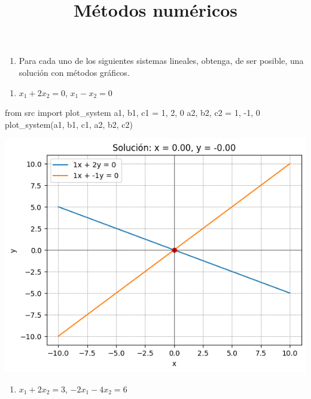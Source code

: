 \documentclass[
  letterpaper,
  DIV=11,
  numbers=noendperiod]{scrartcl}
\title{Métodos numéricos}
\author{}
\date{}
\newenvironment{Shaded}{\begin{snugshade}}{\end{snugshade}}
\newcommand{\DecValTok}[1]{\textcolor[rgb]{0.68,0.00,0.00}{#1}}
\newcommand{\ImportTok}[1]{\textcolor[rgb]{0.00,0.46,0.62}{#1}}
\newcommand{\NormalTok}[1]{\textcolor[rgb]{0.00,0.23,0.31}{#1}}
\newcommand{\OperatorTok}[1]{\textcolor[rgb]{0.37,0.37,0.37}{#1}}
\providecommand{\tightlist}{%
  \setlength{\itemsep}{0pt}\setlength{\parskip}{0pt}}\usepackage{longtable,booktabs,array}
\begin{document}
\maketitle

\begin{enumerate}
\def\labelenumi{\arabic{enumi}.}
\tightlist
\item
  Para cada uno de los siguientes sistemas lineales, obtenga, de ser
  posible, una solución con métodos gráficos.
\end{enumerate}

\begin{enumerate}
\def\labelenumi{\alph{enumi}.}
\tightlist
\item
  \(x_1 + 2x_2 = 0\), \(x_1 - x_2 = 0\)
\end{enumerate}

\begin{Shaded}
\begin{Highlighting}[]
\ImportTok{from}\NormalTok{ src }\ImportTok{import}\NormalTok{ plot\_system}
\NormalTok{a1, b1, c1 }\OperatorTok{=} \DecValTok{1}\NormalTok{, }\DecValTok{2}\NormalTok{, }\DecValTok{0}
\NormalTok{a2, b2, c2 }\OperatorTok{=} \DecValTok{1}\NormalTok{, }\OperatorTok{{-}}\DecValTok{1}\NormalTok{, }\DecValTok{0}
\NormalTok{plot\_system(a1, b1, c1, a2, b2, c2)}
\end{Highlighting}
\end{Shaded}

\includegraphics{tarea9_files/figure-pdf/cell-2-output-1.png}

\begin{enumerate}
\def\labelenumi{\alph{enumi}.}
\setcounter{enumi}{1}
\tightlist
\item
  \(x_1 + 2x_2 = 3\), \(-2x_1 - 4x_2 = 6\)
\end{enumerate}
\end{document}
